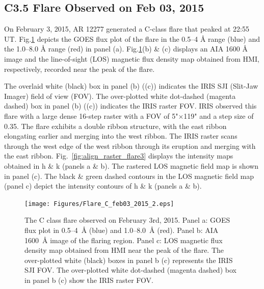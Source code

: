 \subsection{C3.5 Flare Observed on Feb 03, 2015}

On February 3, 2015, AR 12277 generated a C-class flare that peaked at 22:55 UT. Fig.\ref{flare3} depicts the GOES flux plot of the flare in the 0.5{--}4 {\AA} range (blue) and the 1.0{--}8.0 {\AA} range (red) in panel (a). Fig.\ref{flare3}(b) \& (c) displays an AIA 1600 {\AA} image and the line-of-sight (LOS) magnetic flux density map obtained from HMI, respectively, recorded near the peak of the flare.

The overlaid white (black) box in panel (b) ((c)) indicates the IRIS SJI (Slit-Jaw Imager) field of view (FOV). The over-plotted white dot-dashed (magenta dashed) box in panel (b) ((c)) indicates the IRIS raster FOV. IRIS observed this flare with a large dense 16-step raster with a FOV of 5"$\times$119" and a step size of 0.35\arcsec. The flare exhibits a double ribbon structure, with the east ribbon elongating earlier and merging into the west ribbon. The IRIS raster scans through the west edge of the west ribbon through its eruption and merging with the east ribbon. Fig.~\ref{fig:align_raster_flare3} displays the intensity maps obtained in   h \& k (panels a \& b). The rastered LOS magnetic field map is shown in panel (c). The black \& green dashed contours in the LOS magnetic field map (panel c) depict the intensity contours of   h \& k (panels a \& b).

\begin{figure}[ht!]
    \centering
\hspace*{-.6in}
\texttt{[image: Figures/Flare\_C\_feb03\_2015\_2.eps]}
\caption{The C class flare observed on February 3rd, 2015. Panel a: GOES flux plot in 0.5{--}4~{\AA} (blue) and 1.0{--}8.0~{\AA} (red). Panel b: AIA 1600~{\AA} image of the flaring region. Panel c: LOS magnetic flux density map obtained from HMI near the peak of the flare. The over-plotted white (black) boxes in panel b (c) represents the IRIS SJI FOV. The over-plotted white dot-dashed (magenta dashed) box in panel b (c) show the IRIS raster FOV.}\label{flare3}
\end{figure}

